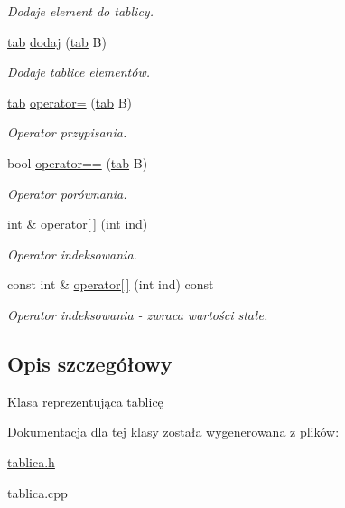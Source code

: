 \begin{DoxyCompactItemize}
\begin{DoxyCompactList}\small\item\em \-Dodaje element do tablicy. \end{DoxyCompactList}\item 
\hypertarget{classtab_a90dc8cfffe8244a6ae1218fd0444f399}{\hyperlink{classtab}{tab} \hyperlink{classtab_a90dc8cfffe8244a6ae1218fd0444f399}{dodaj} (\hyperlink{classtab}{tab} \-B)}\label{classtab_a90dc8cfffe8244a6ae1218fd0444f399}

\begin{DoxyCompactList}\small\item\em \-Dodaje tablice elementów. \end{DoxyCompactList}\item 
\hypertarget{classtab_a05351f5dbd8a13885d98b3165245e498}{\hyperlink{classtab}{tab} \hyperlink{classtab_a05351f5dbd8a13885d98b3165245e498}{operator=} (\hyperlink{classtab}{tab} \-B)}\label{classtab_a05351f5dbd8a13885d98b3165245e498}

\begin{DoxyCompactList}\small\item\em \-Operator przypisania. \end{DoxyCompactList}\item 
\hypertarget{classtab_a82eda0243a55cc93e412c46c1eef1b49}{bool \hyperlink{classtab_a82eda0243a55cc93e412c46c1eef1b49}{operator==} (\hyperlink{classtab}{tab} \-B)}\label{classtab_a82eda0243a55cc93e412c46c1eef1b49}

\begin{DoxyCompactList}\small\item\em \-Operator porównania. \end{DoxyCompactList}\item 
\hypertarget{classtab_a3c549759a4a4870aa49c798c05915e2b}{int \& \hyperlink{classtab_a3c549759a4a4870aa49c798c05915e2b}{operator\mbox{[}$\,$\mbox{]}} (int ind)}\label{classtab_a3c549759a4a4870aa49c798c05915e2b}

\begin{DoxyCompactList}\small\item\em \-Operator indeksowania. \end{DoxyCompactList}\item 
\hypertarget{classtab_aa0611573459a2dad5500d8315ef6fccc}{const int \& \hyperlink{classtab_aa0611573459a2dad5500d8315ef6fccc}{operator\mbox{[}$\,$\mbox{]}} (int ind) const }\label{classtab_aa0611573459a2dad5500d8315ef6fccc}

\begin{DoxyCompactList}\small\item\em \-Operator indeksowania -\/ zwraca wartości stałe. \end{DoxyCompactList}\end{DoxyCompactItemize}


\subsection{\-Opis szczegółowy}
\-Klasa reprezentująca tablicę 

\-Dokumentacja dla tej klasy została wygenerowana z plików\-:\begin{DoxyCompactItemize}
\item 
\hyperlink{tablica_8h}{tablica.\-h}\item 
tablica.\-cpp\end{DoxyCompactItemize}
